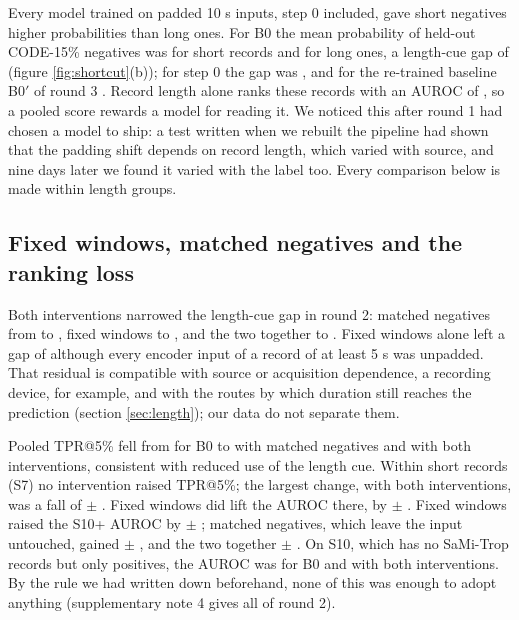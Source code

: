 \documentclass{iopjournal}
\makeatletter
\newcommand{\tpr}{TPR@5\%}
\newcommand{\Bp}{B0$'$}
\makeatother
\begin{document}
Every model trained on padded 10 s inputs, step 0 included, gave short negatives higher probabilities than long ones. For B0 the mean probability of held-out CODE-15\% negatives was \bzNegShort{} for short records and \bzNegLong{} for long ones, a length-cue gap of \bzGap{} (figure \ref{fig:shortcut}(b)); for step 0 the gap was \rowZeroGap, and for the re-trained baseline \Bp{} of round 3 \rThreeBzGap. Record length alone ranks these records with an AUROC of \durOnlyB, so a pooled score rewards a model for reading it. We noticed this after round 1 had chosen a model to ship: a test written when we rebuilt the pipeline had shown that the padding shift depends on record length, which varied with source, and nine days later we found it varied with the label too. Every comparison below is made within length groups.

\subsection{Fixed windows, matched negatives and the ranking loss}
\label{sec:res-cue}
Both interventions narrowed the length-cue gap in round 2: matched negatives from \bzGap{} to \mOneGap, fixed windows to \wOneGap, and the two together to \mwGap. Fixed windows alone left a gap of \wOneGap{} although every encoder input of a record of at least 5 s was unpadded. That residual is compatible with source or acquisition dependence, a recording device, for example, and with the routes by which duration still reaches the prediction (section \ref{sec:length}); our data do not separate them.

Pooled \tpr{} fell from \bzA{} for B0 to \mOneA{} with matched negatives and \mwA{} with both interventions, consistent with reduced use of the length cue. Within short records (S7) no intervention raised \tpr; the largest change, with both interventions, was a fall of \mwDSseven{} $\pm$ \mwDSsevenSe. Fixed windows did lift the AUROC there, by \wOneDSsevenAuc{} $\pm$ \wOneDSsevenAucSe. Fixed windows raised the S10+ AUROC by \wOneDStenPlusAuc{} $\pm$ \wOneDStenPlusAucSe; matched negatives, which leave the input untouched, gained \mOneDStenPlusAuc{} $\pm$ \mOneDStenPlusAucSe, and the two together \mwDStenPlusAuc{} $\pm$ \mwDStenPlusAucSe. On S10, which has no SaMi-Trop records but only \nStenPos{} positives, the AUROC was \bzStenAuc{} for B0 and \mwStenAuc{} with both interventions. By the rule we had written down beforehand, none of this was enough to adopt anything (supplementary note 4 gives all of round 2).
\end{document}
